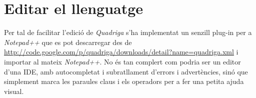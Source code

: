 \section{Editar el llenguatge}

  Per tal de facilitar l'edició de {\em Quadriga} s'ha implementat un senzill plug-in per a {\em Notepad++} que es pot descarregar des de \url{http://code.google.com/p/quadriga/downloads/detail?name=quadriga.xml} i importar al mateix {\em Notepad++}. No és tan complert com podria ser un editor d'una IDE, amb autocompletat i subratllament d'errors i advertències, sinó que simplement marca les paraules claus i els operadors per a fer una petita ajuda visual.